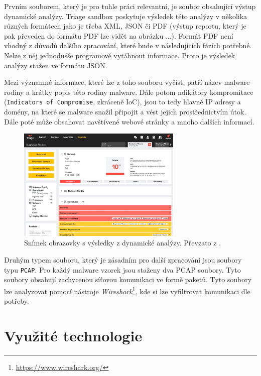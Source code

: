 Prvním souborem, který je pro tuhle práci relevantní, je soubor obsahující výstup dynamické analýzy. Triage sandbox poskytuje výsledek této analýzy v několika různých formátech jako je třeba XML, JSON či PDF (výstup reportu, který je pak převeden do formátu PDF lze vidět na obrázku ...).
Formát PDF není vhodný z důvodů dalšího zpracování, které bude v následujících fázích potřebné. Nelze z něj jednodušše programově vytáhnout informace. Proto je výsledek analýzy stažen ve formátu JSON.

Mezi významné informace, které lze z toho souboru vyčíst, patří název malware rodiny a krátky popis této rodiny malware. Dále potom ndikátory kompromitace (\texttt{Indicators of Compromise}, zkráceně IoC), 
jsou to tedy hlavně IP adresy a domény, na které se malware snažil připojit a vést jejich prostřednictvím útok. Dále poté může obsahovat navštívené webové stránky a mnoho dalších informací.

\begin{figure}[h]
	\centering
        \includegraphics[width=0.7\textwidth]{obrazky/3-triage-report.png}
	\caption{Snímek obrazovky s výsledky z dynamické analýzy. Převzato z \cite{hatching}.}
    \label{Report_image}
\end{figure}

Druhým typem souboru, který je zásadním pro další zpracování jsou soubory typu \texttt{PCAP}. Pro každý malware vzorek jsou staženy dva PCAP soubory.
Tyto soubory obsahují zachycenou síťovou komunikaci ve formě paketů. Tyto soubory lze analyzovat pomocí nástroje \textit{Wireshark}\footnote{\href{https://www.wireshark.org/}{https://www.wireshark.org/}}, 
kde si lze vyfiltrovat komunikaci dle potřeby.

\newpage
\section{Využité technologie}

